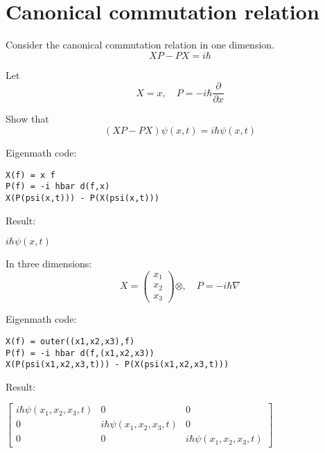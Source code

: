 

\section*{Canonical commutation relation}

Consider the canonical commutation relation in one dimension.
\begin{equation*}
XP-PX=i\hbar
\end{equation*}

Let
\begin{equation*}
X=x,\quad P=-i\hbar\frac{\partial}{\partial x}
\end{equation*}

Show that
\begin{equation*}
(XP-PX)\psi(x,t)=i\hbar\psi(x,t)
\end{equation*}

Eigenmath code:
{\color{blue}
\begin{verbatim}
X(f) = x f
P(f) = -i hbar d(f,x)
X(P(psi(x,t))) - P(X(psi(x,t)))
\end{verbatim}}

Result:

\bigskip
$i\hbar\psi(x,t)$

\bigskip
In three dimensions:
\begin{equation*}
X=\begin{pmatrix}x_1\\x_2\\x_3\end{pmatrix}\otimes,\quad P=-i\hbar\nabla
\end{equation*}

Eigenmath code:
{\color{blue}
\begin{verbatim}
X(f) = outer((x1,x2,x3),f)
P(f) = -i hbar d(f,(x1,x2,x3))
X(P(psi(x1,x2,x3,t))) - P(X(psi(x1,x2,x3,t)))
\end{verbatim}}

Result:

\bigskip
$\begin{bmatrix}
i\hbar\psi(x_1,x_2,x_3,t)&0&0\\
0&i\hbar\psi(x_1,x_2,x_3,t)&0\\
0&0&i\hbar\psi(x_1,x_2,x_3,t)
\end{bmatrix}
$


